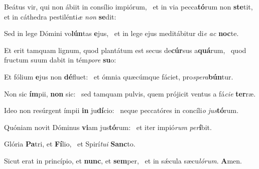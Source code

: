 \item Beátus vir, qui non ábiit in consílio impiórum,~\pscross{} et in via pecca\textbf{tó}rum non \textbf{ste}tit,~\psstar{} et in cáthedra pestilénti\textit{æ} \textit{non} \textbf{se}dit:
\item Sed in lege Dómini vo\textbf{lún}tas \textbf{e}jus,~\psstar{} et in lege ejus meditábitur di\textit{e} \textit{ac} \textbf{noc}te.
\item Et erit tamquam lignum, quod plantátum est secus de\textbf{cúr}sus a\textbf{quá}rum,~\psstar{} quod fructum suum dabit in tém\textit{po}\textit{re} \textbf{su}o:
\item Et fólium \textbf{e}jus non \textbf{dé}fluet:~\psstar{} et ómnia quæcúmque fáciet, pro\textit{spe}\textit{ra}\textbf{bún}tur.
\item Non sic \textbf{ím}pii, \textbf{non} sic:~\psstar{} sed tamquam pulvis, quem prójicit ventus a fá\textit{ci}\textit{e} \textbf{ter}ræ.
\item Ideo non resúrgent ímpii \textbf{in} ju\textbf{dí}cio:~\psstar{} neque peccatóres in concíli\textit{o} \textit{jus}\textbf{tó}rum.
\item Quóniam novit Dóminus \textbf{vi}am jus\textbf{tó}rum:~\psstar{} et iter impió\textit{rum} \textit{per}\textbf{í}bit.
\item Glória \textbf{Pa}tri, et \textbf{Fí}lio,~\psstar{} et Spirí\textit{tu}\textit{i} \textbf{Sanc}to.
\item Sicut erat in princípio, et \textbf{nunc}, et \textbf{sem}per,~\psstar{} et in sǽcula sæcu\textit{ló}\textit{rum}. \textbf{A}men.
